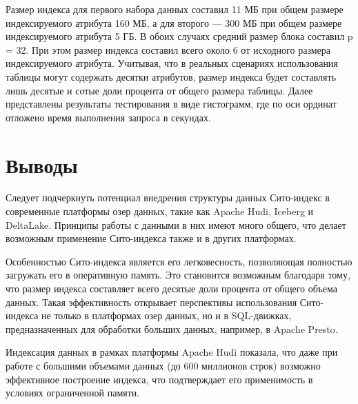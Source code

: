 Размер индекса для первого набора данных составил 11 МБ при общем размере индексируемого атрибута 160 МБ, а для второго — 300 МБ при общем размере индексируемого атрибута 5 ГБ. В обоих случаях средний размер блока составил p = 32. При этом размер индекса составил всего около 6 от исходного размера индексируемого атрибута. Учитывая, что в реальных сценариях использования таблицы могут содержать десятки атрибутов, размер индекса будет составлять лишь десятые и сотые доли процента от общего размера таблицы.
Далее представлены результаты тестирования в виде гистограмм, где по оси ординат отложено время выполнения запроса в секундах.


\section*{Выводы}

Следует подчеркнуть потенциал внедрения структуры данных Сито-индекс в современные платформы озер данных, такие как Apache Hudi, Iceberg и DeltaLake. Принципы работы с данными в них имеют много общего, что делает возможным применение Сито-индекса также и в других платформах.

Особенностью Сито-индекса является его легковесность, позволяющая полностью загружать его в оперативную память. Это становится возможным благодаря тому, что размер индекса составляет всего десятые доли процента от общего объема данных. Такая эффективность открывает перспективы использования Сито-индекса не только в платформах озер данных, но и в SQL-движках, предназначенных для обработки больших данных, например, в Apache Presto.

Индексация данных в рамках платформы Apache Hudi показала, что даже при работе с большими объемами данных (до 600 миллионов строк) возможно эффективное построение индекса, что подтверждает его применимость в условиях ограниченной памяти.
